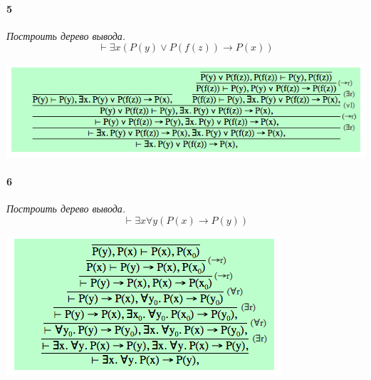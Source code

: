\documentclass[russian]{article}
\begin{document}
\paragraph{5} \textit{Построить дерево вывода.
\[
\vdash \exists x (P(y) \vee P(f(z)) \rightarrow P(x))
\]}

\begin{center}
\includegraphics[scale=0.64]{5.png} 
\end{center}

\paragraph{6} \textit{Построить дерево вывода.
\[
\vdash \exists x \forall y (P(x) \rightarrow P(y))
\]}

\begin{center}
\includegraphics[scale=0.64]{6.png} 
\end{center}
\end{document}
